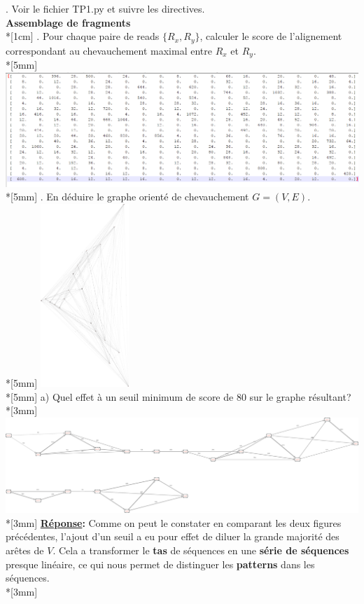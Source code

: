 \documentclass[11pt, letterpaper]{article}
\begin{document}
{. Voir le fichier TP1.py et suivre les directives. \\
\newpage
\textbf{Assemblage de fragments} \\*[1cm]
. Pour chaque paire de reads $\{R_x, R_y \}$, calculer le score de l'alignement correspondant au chevauchement maximal entre $R_x$ et $R_y$. \\*[5mm]
\includegraphics[width=\textwidth]{Images/Matrix_assemblage_no1.png} \\*[5mm]
. En déduire le graphe orienté de chevauchement $G = (V,E)$. \\*[5mm]
\centering
\includegraphics[width=0.25\textwidth]{Images/Assemblage_no2_initial.png}\\*[5mm]
\newpage
\flushleft
a) Quel effet à un seuil minimum de score de 80 sur le graphe résultant? \\*[3mm]
\includegraphics[width=\textwidth]{Images/Assemblage_no2_plus80.png} \\*[3mm]
\textbf{\underline{Réponse}:} Comme on peut le constater en comparant les deux figures précédentes, l'ajout d'un seuil a eu pour effet de diluer la grande majorité des arêtes de $V$. Cela a transformer le \textbf{tas} de séquences en une \textbf{série de séquences} presque linéaire, ce qui nous permet de distinguer les \textbf{patterns} dans les séquences. \\*[3mm]
}
\end{document}
